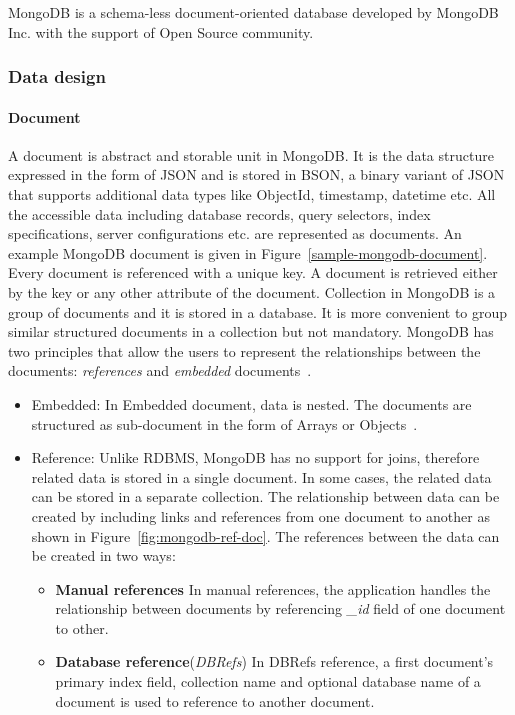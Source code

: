 MongoDB is a schema-less document-oriented database developed by MongoDB Inc. with the support of Open Source community. 
\subsubsection{Data design} 
\paragraph{Document}
	A document is abstract and storable unit in MongoDB. It is the data structure expressed in the form of JSON and is stored in BSON, a binary variant of JSON that supports additional data types like ObjectId, timestamp, datetime etc. All the accessible data including database records, query selectors, index specifications, server configurations etc. are represented as documents. An example  MongoDB document is given in Figure~\ref{sample-mongodb-document}.
Every document is referenced with a unique key. A document is retrieved either by the key or any other attribute of the document. Collection in MongoDB is a group of documents and it is stored in a database. It is more convenient to group similar structured documents in a collection but not mandatory. MongoDB has two principles that allow the users to represent the relationships between the documents: \textit{references} and \textit{embedded} documents~\citep{mongodb:org}. 
\begin{itemize}
\item {Embedded:}\label{mongo:embedded}
    In Embedded document, data is nested. The documents are structured as sub-document in the form of Arrays or Objects~\citep{nosql/comparision}. 
    \item{Reference:}
    Unlike RDBMS, MongoDB has no support for joins, therefore related data is stored in a single document. In some cases, the related data can be stored in a separate collection. The relationship between data can be created by including links and references from one document to another as shown in Figure~\ref{fig:mongodb-ref-doc}.  The references between the data can be created in two ways:
\begin{itemize}
	\item {\textbf{Manual references}}
		In manual references, the application handles the relationship between documents by referencing \textit{\_id} field of one document to other. 
	\item \textbf{Database reference}(\textit{DBRefs})
	In  DBRefs reference, a first document's primary index field, collection name and optional database name of a document is used to reference to another document.
\end{itemize}



\end{itemize}

